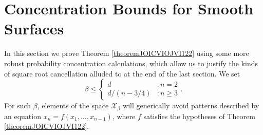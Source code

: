 \documentclass[dvipsnames,letterpaper,12pt]{article}
\numberwithin{equation}{section}
\numberwithin{theorem}{section}
\begin{document}
\section{Concentration Bounds for Smooth Surfaces}

In this section we prove Theorem \ref{theoremJOICVIOJVI122} using some more robust probability concentration calculations, which allow us to justify the kinds of square root cancellation alluded to at the end of the last section. We set
%
\[ \beta \leq \begin{cases} d &: n = 2 \\ d/(n - 3/4) &: n \geq 3 \end{cases}. \]
%
For such $\beta$, elements of the space $\mathcal{X}_\beta$ will generically avoid patterns described by an equation $x_n = f(x_1,\dots,x_{n-1})$, where $f$ satisfies the hypotheses of Theorem \ref{theoremJOICVIOJVI122}.
\end{document}
